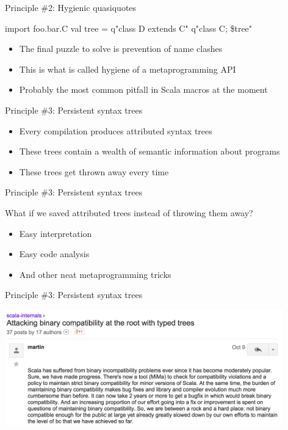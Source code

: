 \documentclass[svgnames,dvipsnames,hyperref={bookmarks=false},usepdftitle=false]{beamer}
\begin{document}
\begin{frame}[fragile]{Principle \#2: Hygienic quasiquotes}
\begin{semiverbatim}
import foo.bar.C
val tree = q"class D extends C"
q"class C; \$tree"

\end{semiverbatim}

\begin{itemize}
\item The final puzzle to solve is prevention of name clashes
\item This is what is called hygiene of a metaprogramming API
\item Probably the most common pitfall in Scala macros at the moment
\end{itemize}

\end{frame}

\begin{frame}{Principle \#3: Persistent syntax trees}

\begin{itemize}
\item Every compilation produces attributed syntax trees
\item These trees contain a wealth of semantic information about programs
\item These trees get thrown away every time
\end{itemize}

\end{frame}

\begin{frame}{Principle \#3: Persistent syntax trees}

What if we saved attributed trees instead of throwing them away?
\begin{itemize}
\item Easy interpretation
\item Easy code analysis
\item And other neat metaprogramming tricks
\end{itemize}

\end{frame}

\begin{frame}[c, fragile]{Principle \#3: Persistent syntax trees}
\begin{center}
\includegraphics[height=5cm]{martin.png}
\end{center}
\end{frame}
\end{document}
